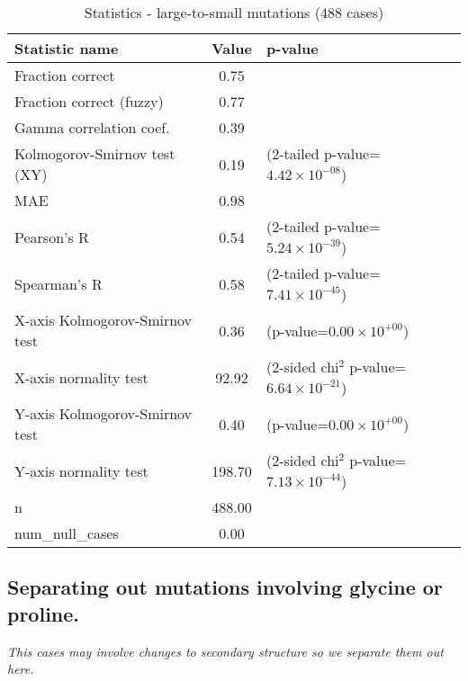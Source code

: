 \documentclass[10pt, letterpaper, oneside, titlepage, landscape]{scrreprt}
\begin{document}
\begin{table}[H]\begin{center}
\begin{tabular}{ l S[table-format=3.2] l}
Statistic name & {Value} & p-value\\
\hline
Fraction correct & 0.75 & \\
Fraction correct (fuzzy) & 0.77 & \\
Gamma correlation coef. & 0.39 & \\
Kolmogorov-Smirnov test (XY) & 0.19 & (2-tailed p-value=$4.42\times10^{-08}$)\\
MAE & 0.98 & \\
Pearson's R & 0.54 & (2-tailed p-value=$5.24\times10^{-39}$)\\
Spearman's R & 0.58 & (2-tailed p-value=$7.41\times10^{-45}$)\\
X-axis Kolmogorov-Smirnov test & 0.36 & (p-value=$0.00\times10^{+00}$)\\
X-axis normality test & 92.92 & (2-sided chi$^{2}$ p-value=$6.64\times10^{-21}$)\\
Y-axis Kolmogorov-Smirnov test & 0.40 & (p-value=$0.00\times10^{+00}$)\\
Y-axis normality test & 198.70 & (2-sided chi$^{2}$ p-value=$7.13\times10^{-44}$)\\
n & 488.00 & \\
num\_null\_cases & 0.00 & \\
\end{tabular}
\caption{Statistics - large-to-small mutations (488 cases)}
\end{center}\end{table}


\subsection{Separating out mutations involving glycine or proline.}
\textit{This cases may involve changes to secondary structure so we separate them out here.}
\end{document}
